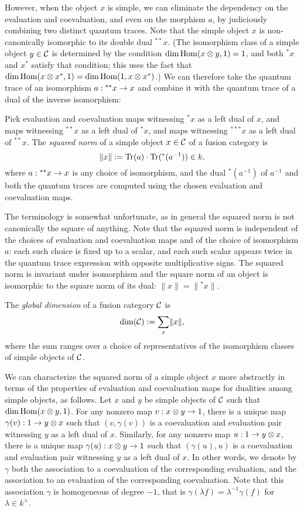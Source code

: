 \documentclass{amsart}
\begin{document}
However, when the object $x$ is simple, we can eliminate the dependency on the evaluation and coevaluation, and even on the morphism $a$, by judiciously combining two distinct quantum traces.  Note that the simple object $x$ is non-canonically isomorphic to its double dual ${}^{**} x$.  (The isomorphism class of a simple object $y \in \mathcal C$ is determined by the condition $\dim \operatorname{Hom}(x \otimes y,1) = 1$, and both ${}^* x$ and $x^*$ satisfy that condition; this uses the fact that $\dim \operatorname{Hom}(x \otimes x^*,1) = \dim \operatorname{Hom}(1, x \otimes x^*)$.)  We can therefore take the quantum trace of an isomorphism $a: {}^{**} x \rightarrow x$ and combine it with the quantum trace of a dual of the inverse isomorphism:
\begin{definition}
Pick evaluation and coevaluation maps witnessing ${}^* x$ as a left dual of $x$, and maps witnessing ${}^{**} x$ as a left dual of ${}^* x$, and maps witnessing ${}^{***} x$ as a left dual of ${}^{**} x$.  The \emph{squared norm} of a simple object $x \in \mathcal C$ of a fusion category is
\[
\lVert x \rVert := \mathrm{Tr}(a) \cdot \mathrm{Tr}({}^*(a^{-1})) \in k,
\]
where $a: {}^{**} x \rightarrow x$ is any choice of isomorphism, and the dual ${}^*(a^{-1})$ of $a^{-1}$ and both the quantum traces are computed using the chosen evaluation and coevaluation maps.
\end{definition}
\nid The terminology is somewhat unfortunate, as in general the squared norm is not canonically the square of anything.  Note that the squared norm is independent of the choices of evaluation and coevaluation maps and of the choice of isomorphism $a$: each such choice is fixed up to a scalar, and each such scalar appears twice in the quantum trace expression with opposite multiplicative signs.  The squared norm is invariant under isomorphism and the square norm of an object is isomorphic to the square norm of its dual: $\lVert x \rVert = \lVert {}^* x \rVert$.
\begin{definition}
The \emph{global dimension} of a fusion category $\mathcal C$ is
\[
\dim(\mathcal C) := \sum_{x} \lVert x \rVert,
\]
where the sum ranges over a choice of representatives of the isomorphism classes of simple objects of $\mathcal C$.
\end{definition}

We can characterize the squared norm of a simple object $x$ more abstractly in terms of the properties of evaluation and coevaluation maps for dualities among simple objects, as follows.  Let $x$ and $y$ be simple objects of $\mathcal C$ such that $\dim \operatorname{Hom}(x \otimes y,1)$.  For any nonzero map $v: x \otimes y \rightarrow 1$, there is a unique map $\gamma(v): 1 \rightarrow y \otimes x$ such that $(v,\gamma(v))$ is a coevaluation and evaluation pair witnessing $y$ as a left dual of $x$.  Similarly, for any nonzero map $u: 1 \rightarrow y \otimes x$, there is a unique map $\gamma(u): x \otimes y \rightarrow 1$ such that $(\gamma(u),u)$ is a coevaluation and evaluation pair witnessing $y$ as a left dual of $x$.  In other words, we denote by $\gamma$ both the association to a coevaluation of the corresponding evaluation, and the association to an evaluation of the corresponding coevaluation.  Note that this association $\gamma$ is homogeneous of degree $-1$, that is $\gamma(\lambda f) = \lambda^{-1} \gamma(f)$ for $\lambda \in k^\times$.  
\end{document}

